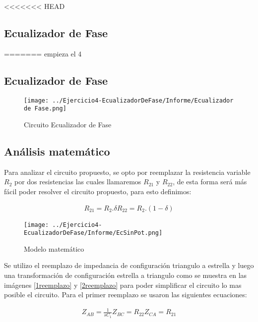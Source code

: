 <<<<<<< HEAD
\subsection{Ecualizador de Fase}
=======
empieza el 4

\subsection{Ecualizador de Fase}


\begin{figure}[H]
	\centering
	\texttt{[image: ../Ejercicio4-EcualizadorDeFase/Informe/Ecualizador de Fase.png]}
	\caption{Circuito Ecualizador de Fase}
\end{figure}


\subsection{Análisis matemático}

Para analizar el circuito propuesto, se opto por reemplazar la resistencia variable $R_2$ por dos resistencias las cuales llamaremos $R_{21}$ y $R_{22}$, de esta forma será más fácil poder resolver el circuito propuesto, para esto definimos:

\begin{align}
	\begin{equation}
		R_{21} = R_2 . \delta
	\end{equation}
	\begin{equation}
		R_{22}= R_2 . (1 - \delta)
	\end{equation}
\end{align}


\begin{figure}[H]
	\centering
	\texttt{[image: ../Ejercicio4-EcualizadorDeFase/Informe/EcSinPot.png]}
	\caption{Modelo matemático}
\end{figure}

Se utilizo el reemplazo de impedancia de configuración triangulo a estrella y luego una transformación de configuración estrella a triangulo como se muestra en las imágenes \ref{1reemplazo} y \ref{2reemplazo}  para poder simplificar el circuito lo mas posible el circuito.
Para el primer reemplazo se usaron las siguientes ecuaciones:

\begin{align}
	\begin{equation}
		Z_{AB}= \frac{1}{sC_1}
	\end{equation}
	\begin{equation}
		Z_{BC}= R_{22}
	\end{equation}
	
	\begin{equation}
		Z_{CA}= R_{21}
	\end{equation}
\end{align}

